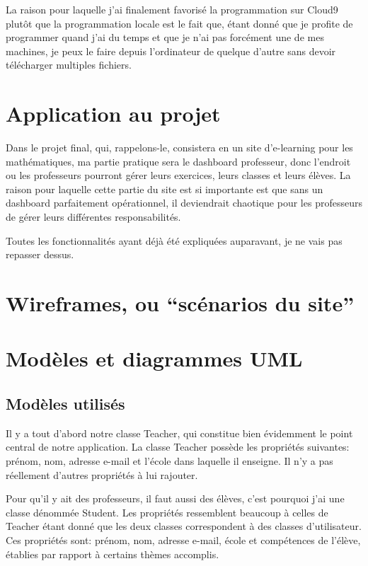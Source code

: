 \documentclass[letterpaper,10pt,french]{sphinxmanual}
\begin{document}
La raison pour laquelle j'ai finalement favorisé la programmation sur Cloud9
plutôt que la programmation locale est le fait que, étant donné que je profite
de programmer quand j'ai du temps et que je n'ai pas forcément une de mes
machines, je peux le faire depuis l'ordinateur de quelque d'autre sans devoir
télécharger multiples fichiers.


\section{Application au projet}
\label{documentation:application-au-projet}
Dans le projet final, qui, rappelons-le, consistera en un site d'e-learning pour
les mathématiques, ma partie pratique sera le dashboard professeur, donc
l'endroit ou les professeurs pourront gérer leurs exercices, leurs classes et
leurs élèves. La raison pour laquelle cette partie du site est si importante
est que sans un dashboard parfaitement opérationnel, il deviendrait chaotique
pour les professeurs de gérer leurs différentes responsabilités.

Toutes les fonctionnalités ayant déjà été expliquées auparavant, je ne vais pas
repasser dessus.


\section{Wireframes, ou ``scénarios du site''}
\label{documentation:wireframes-ou-scenarios-du-site}

\section{Modèles et diagrammes UML}
\label{documentation:modeles-et-diagrammes-uml}

\subsection{Modèles utilisés}
\label{documentation:modeles-utilises}
Il y a tout d'abord notre classe Teacher, qui constitue bien évidemment le
point central de notre application. La classe Teacher possède les propriétés
suivantes: prénom, nom, adresse e-mail et l'école dans laquelle il enseigne.
Il n'y a pas réellement d'autres propriétés à lui rajouter.

Pour qu'il y ait des professeurs, il faut aussi des élèves, c'est pourquoi
j'ai une classe dénommée Student. Les propriétés ressemblent beaucoup à celles
de Teacher étant donné que les deux classes correspondent à des classes
d'utilisateur. Ces propriétés sont: prénom, nom, adresse e-mail, école et
compétences de l'élève, établies par rapport à certains thèmes accomplis.
\end{document}
